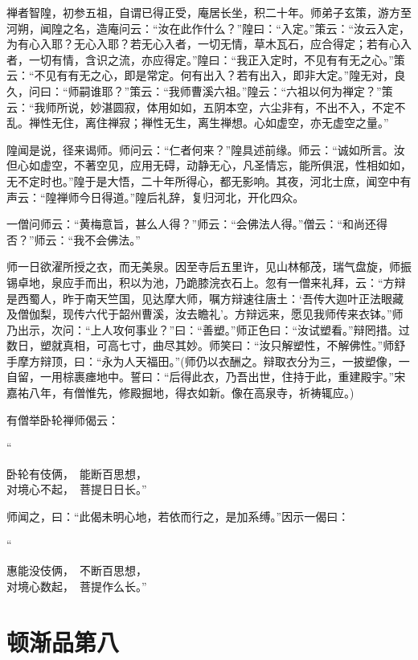 \documentclass[UTF8, 11pt, oneside]{ctexart}
\newenvironment{jizi}[1]{
    \vspace{-1em}\begin{center}
        #1%
        \begin{varwidth}[t]{\linewidth}
}{
        \end{varwidth}
    \end{center}
}
\begin{document}
禅者智隍，初参五祖，自谓已得正受，庵居长坐，积二十年。师弟子玄策，游方至河朔，闻隍之名，造庵问云：“汝在此作什么？”隍曰：“入定。”策云：“汝云入定，为有心入耶？无心入耶？若无心入者，一切无情，草木瓦石，应合得定；若有心入者，一切有情，含识之流，亦应得定。”隍曰：“我正入定时，不见有有无之心。”策云：“不见有有无之心，即是常定。何有出入？若有出入，即非大定。”隍无对，良久，问曰：“师嗣谁耶？”策云：“我师曹溪六祖。”隍云：“六祖以何为禅定？”策云：“我师所说，妙湛圆寂，体用如如，五阴本空，六尘非有，不出不入，不定不乱。禅性无住，离住禅寂；禅性无生，离生禅想。心如虚空，亦无虚空之量。”

隍闻是说，径来谒师。师问云：“仁者何来？”隍具述前缘。师云：“诚如所言。汝但心如虚空，不著空见，应用无碍，动静无心，凡圣情忘，能所俱泯，性相如如，无不定时也。”隍于是大悟，二十年所得心，都无影响。其夜，河北士庶，闻空中有声云：“隍禅师今日得道。”隍后礼辞，复归河北，开化四众。

一僧问师云：“黄梅意旨，甚么人得？”师云：“会佛法人得。”僧云：“和尚还得否？”师云：“我不会佛法。”

师一日欲濯所授之衣，而无美泉。因至寺后五里许，见山林郁茂，瑞气盘旋，师振锡卓地，泉应手而出，积以为池，乃跪膝浣衣石上。忽有一僧来礼拜，云：“方辩是西蜀人，昨于南天竺国，见达摩大师，嘱方辩速往唐土：‘吾传大迦叶正法眼藏及僧伽梨，现传六代于韶州曹溪，汝去瞻礼’。方辩远来，愿见我师传来衣钵。”师乃出示，次问：“上人攻何事业？”曰：“善塑。”师正色曰：“汝试塑看。”辩罔措。过数日，塑就真相，可高七寸，曲尽其妙。师笑曰：“汝只解塑性，不解佛性。”师舒手摩方辩顶，曰：“永为人天福田。”(师仍以衣酬之。辩取衣分为三，一披塑像，一自留，一用棕裹瘗地中。誓曰：“后得此衣，乃吾出世，住持于此，重建殿宇。”宋嘉祐八年，有僧惟先，修殿掘地，得衣如新。像在高泉寺，祈祷辄应。)

有僧举卧轮禅师偈云：

\begin{jizi}{“}
    卧轮有伎俩，　能断百思想， \\
    对境心不起，　菩提日日长。”
\end{jizi}

师闻之，曰：“此偈未明心地，若依而行之，是加系缚。”因示一偈曰：

\begin{jizi}{“}
    惠能没伎俩，　不断百思想， \\
    对境心数起，　菩提作么长。”
\end{jizi}


\section*{顿渐品第八}
\end{document}

